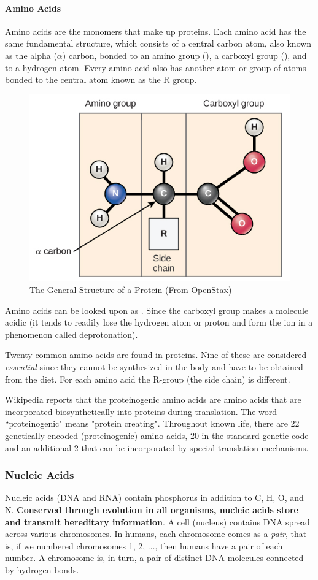 \documentclass[12pt]{article}
\begin{document}
\paragraph{Amino Acids}
Amino acids are the monomers that make up proteins. Each amino acid has the same fundamental structure, which consists of a central carbon atom, also known as the alpha ($\alpha$) carbon, bonded to an amino group (), a carboxyl group (), and to a hydrogen atom. Every amino acid also has another atom or group of atoms bonded to the central atom known as the R group.

\begin{figure}[h!]
    \centering
    \includegraphics[width=0.5\linewidth]{openstax-protein-general-structure.jpg}
    \caption{The General Structure of a Protein (From OpenStax)}
    \label{fig: protein}
\end{figure}

Amino acids can be looked upon as . Since the carboxyl group makes a molecule acidic (it tends to readily lose the hydrogen atom or proton and form the  ion in a phenomenon called deprotonation).

Twenty common amino acids are found in proteins. Nine of these are considered \emph{essential} since they cannot be synthesized in the body and have to be obtained from the diet. For each amino acid the R-group (the side chain) is different.

Wikipedia reports that the proteinogenic amino acids are amino acids that are incorporated biosynthetically into proteins during translation. The word ``proteinogenic" means "protein creating". Throughout known life, there are 22 genetically encoded (proteinogenic) amino acids, 20 in the standard genetic code and an additional 2 that can be incorporated by special translation mechanisms.

\subsubsection{Nucleic Acids}
Nucleic acids (DNA and RNA) contain phosphorus in addition to C, H, O, and N. \textbf{Conserved through evolution in all organisms, nucleic acids store and transmit hereditary information}. A cell (nucleus) contains DNA spread across various chromosomes. In humans, each chromosome comes as a \emph{pair}, that is, if we numbered chromosomes 1, 2, $\dots$, then humans have a pair of each number. A chromosome is, in turn, a \href{https://biology.stackexchange.com/a/996/63085}{pair of distinct DNA molecules} connected by hydrogen bonds.
\end{document}
